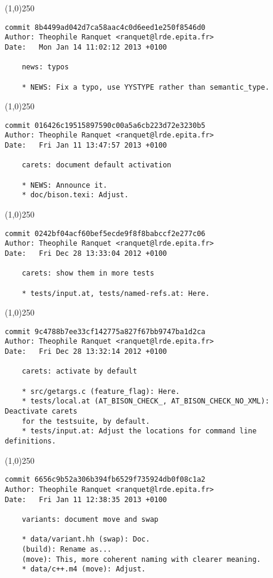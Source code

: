 \line(1,0){250}
\begin{verbatim}
commit 8b4499ad042d7ca58aac4c0d6eed1e250f8546d0
Author: Theophile Ranquet <ranquet@lrde.epita.fr>
Date:   Mon Jan 14 11:02:12 2013 +0100

    news: typos
    
    * NEWS: Fix a typo, use YYSTYPE rather than semantic_type.

\end{verbatim}
\line(1,0){250}
\begin{verbatim}
commit 016426c19515897590c00a5a6cb223d72e3230b5
Author: Theophile Ranquet <ranquet@lrde.epita.fr>
Date:   Fri Jan 11 13:47:57 2013 +0100

    carets: document default activation
    
    * NEWS: Announce it.
    * doc/bison.texi: Adjust.

\end{verbatim}
\line(1,0){250}
\begin{verbatim}
commit 0242bf04acf60bef5ecde9f8f8babccf2e277c06
Author: Theophile Ranquet <ranquet@lrde.epita.fr>
Date:   Fri Dec 28 13:33:04 2012 +0100

    carets: show them in more tests
    
    * tests/input.at, tests/named-refs.at: Here.

\end{verbatim}
\line(1,0){250}
\begin{verbatim}
commit 9c4788b7ee33cf142775a827f67bb9747ba1d2ca
Author: Theophile Ranquet <ranquet@lrde.epita.fr>
Date:   Fri Dec 28 13:32:14 2012 +0100

    carets: activate by default
    
    * src/getargs.c (feature_flag): Here.
    * tests/local.at (AT_BISON_CHECK_, AT_BISON_CHECK_NO_XML): Deactivate carets
    for the testsuite, by default.
    * tests/input.at: Adjust the locations for command line definitions.

\end{verbatim}
\line(1,0){250}
\begin{verbatim}
commit 6656c9b52a306b394fb6529f735924db0f08c1a2
Author: Theophile Ranquet <ranquet@lrde.epita.fr>
Date:   Fri Jan 11 12:38:35 2013 +0100

    variants: document move and swap
    
    * data/variant.hh (swap): Doc.
    (build): Rename as...
    (move): This, more coherent naming with clearer meaning.
    * data/c++.m4 (move): Adjust.

\end{verbatim}
